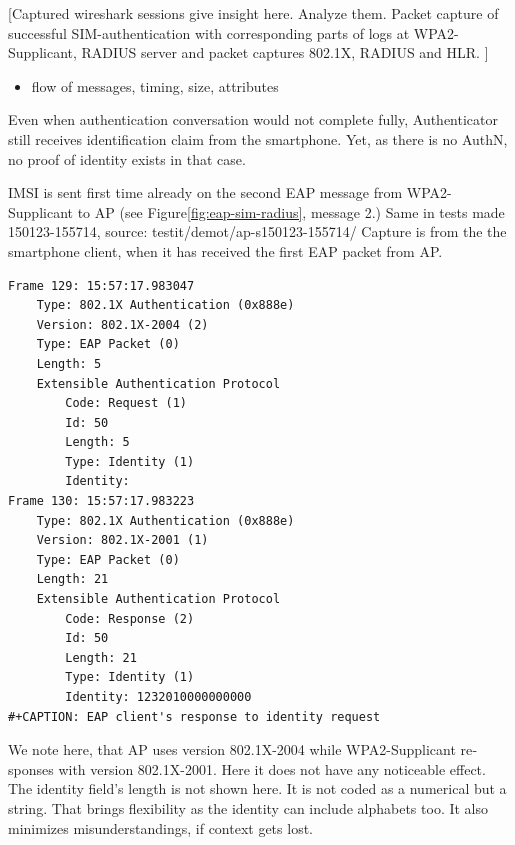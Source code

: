 \documentclass[12pt,a4paper,english]{tutthesis}
\begin{document}
\begin{otherlanguage}{english}
[Captured wireshark sessions give insight here. Analyze them.
Packet capture of successful SIM-authentication with corresponding
parts of logs at WPA2-Supplicant, RADIUS server and packet captures 
802.1X, RADIUS and HLR. ]

\begin{itemize}
\item flow of messages,  timing,  size, attributes
\end{itemize}

Even when authentication conversation would not complete fully,
Authenticator still receives identification claim from the smartphone. Yet, as
there is no AuthN, no proof of identity exists in that case.

IMSI is sent first time already on the second EAP message from 
WPA2-Supplicant to AP (see Figure\ref{fig:eap-sim-radius}, message 2.)
Same in tests made 150123-155714, source:
testit/demot/ap-s150123-155714/
Capture is from the the smartphone client, when it has received the first EAP
packet from AP.

\begin{verbatim}
Frame 129: 15:57:17.983047
    Type: 802.1X Authentication (0x888e)
    Version: 802.1X-2004 (2)
    Type: EAP Packet (0)
    Length: 5
    Extensible Authentication Protocol
        Code: Request (1)
        Id: 50
        Length: 5
        Type: Identity (1)
        Identity: 
Frame 130: 15:57:17.983223
    Type: 802.1X Authentication (0x888e)
    Version: 802.1X-2001 (1)
    Type: EAP Packet (0)
    Length: 21
    Extensible Authentication Protocol
        Code: Response (2)
        Id: 50
        Length: 21
        Type: Identity (1)
        Identity: 1232010000000000
#+CAPTION: EAP client's response to identity request
\end{verbatim}
We note here, that AP uses version 802.1X-2004 while WPA2-Supplicant responses with
version 802.1X-2001. Here it does not have any noticeable effect.
The identity field's length is not shown here.
It is not coded as a numerical but a string.
That brings flexibility as the identity can include alphabets too. It also minimizes misunderstandings,
if context gets lost.






\end{otherlanguage}
\end{document}
